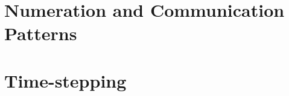 \documentclass[a4paper]{book}
\begin{document}
  \chapter{Numeration and Communication Patterns}
  
  
  
  
  
  

  \chapter{Time-stepping}
  
  
  

  \printindex
\end{document}
